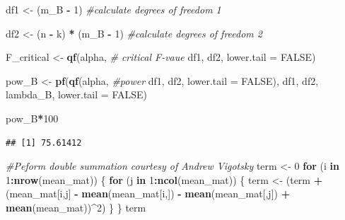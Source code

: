 \documentclass[
]{book}
\newenvironment{Shaded}{\begin{snugshade}}{\end{snugshade}}
\newcommand{\CommentTok}[1]{\textcolor[rgb]{0.56,0.35,0.01}{\textit{#1}}}
\newcommand{\ControlFlowTok}[1]{\textcolor[rgb]{0.13,0.29,0.53}{\textbf{#1}}}
\newcommand{\DataTypeTok}[1]{\textcolor[rgb]{0.13,0.29,0.53}{#1}}
\newcommand{\DecValTok}[1]{\textcolor[rgb]{0.00,0.00,0.81}{#1}}
\newcommand{\KeywordTok}[1]{\textcolor[rgb]{0.13,0.29,0.53}{\textbf{#1}}}
\newcommand{\NormalTok}[1]{#1}
\newcommand{\OperatorTok}[1]{\textcolor[rgb]{0.81,0.36,0.00}{\textbf{#1}}}
\newcommand{\OtherTok}[1]{\textcolor[rgb]{0.56,0.35,0.01}{#1}}
\newcommand{\StringTok}[1]{\textcolor[rgb]{0.31,0.60,0.02}{#1}}
\begin{document}
\begin{Shaded}
\begin{Highlighting}[]
\NormalTok{df1 <-}\StringTok{ }\NormalTok{(m_B }\OperatorTok{-}\StringTok{ }\DecValTok{1}\NormalTok{) }\CommentTok{#calculate degrees of freedom 1}

\NormalTok{df2 <-}\StringTok{ }\NormalTok{(n }\OperatorTok{-}\StringTok{ }\NormalTok{k) }\OperatorTok{*}\StringTok{ }\NormalTok{(m_B }\OperatorTok{-}\StringTok{ }\DecValTok{1}\NormalTok{) }\CommentTok{#calculate degrees of freedom 2}

\NormalTok{F_critical <-}\StringTok{ }\KeywordTok{qf}\NormalTok{(alpha, }\CommentTok{# critical F-vaue}
\NormalTok{                 df1,}
\NormalTok{                 df2,}
                 \DataTypeTok{lower.tail =} \OtherTok{FALSE}\NormalTok{) }

\NormalTok{pow_B <-}\StringTok{ }\KeywordTok{pf}\NormalTok{(}\KeywordTok{qf}\NormalTok{(alpha, }\CommentTok{#power }
\NormalTok{             df1, }
\NormalTok{             df2, }
             \DataTypeTok{lower.tail =} \OtherTok{FALSE}\NormalTok{), }
\NormalTok{          df1, }
\NormalTok{          df2, }
\NormalTok{          lambda_B, }
          \DataTypeTok{lower.tail =} \OtherTok{FALSE}\NormalTok{)}


\NormalTok{pow_B}\OperatorTok{*}\DecValTok{100}
\end{Highlighting}
\end{Shaded}

\begin{verbatim}
## [1] 75.61412
\end{verbatim}

\begin{Shaded}
\begin{Highlighting}[]
\CommentTok{#Peform double summation courtesy of Andrew Vigotsky}
\NormalTok{term <-}\StringTok{ }\DecValTok{0}
\ControlFlowTok{for}\NormalTok{ (i }\ControlFlowTok{in} \DecValTok{1}\OperatorTok{:}\KeywordTok{nrow}\NormalTok{(mean_mat)) \{}
  \ControlFlowTok{for}\NormalTok{ (j }\ControlFlowTok{in} \DecValTok{1}\OperatorTok{:}\KeywordTok{ncol}\NormalTok{(mean_mat)) \{}
\NormalTok{    term <-}\StringTok{ }\NormalTok{(term }\OperatorTok{+}\StringTok{ }\NormalTok{(mean_mat[i,j] }\OperatorTok{-}\StringTok{ }
\StringTok{                       }\KeywordTok{mean}\NormalTok{(mean_mat[i,]) }\OperatorTok{-}\StringTok{ }
\StringTok{                       }\KeywordTok{mean}\NormalTok{(mean_mat[,j]) }\OperatorTok{+}\StringTok{ }\KeywordTok{mean}\NormalTok{(mean_mat))}\OperatorTok{^}\DecValTok{2}\NormalTok{)}
\NormalTok{  \}}
\NormalTok{\}}
\NormalTok{term}
\end{Highlighting}
\end{Shaded}
\end{document}
